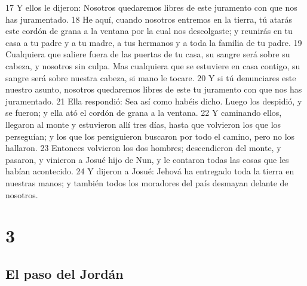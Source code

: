 17 Y ellos le dijeron: Nosotros quedaremos libres de este juramento con que nos has juramentado.
18 He aquí, cuando nosotros entremos en la tierra, tú atarás este cordón de grana a la ventana por la cual nos descolgaste; y reunirás en tu casa a tu padre y a tu madre, a tus hermanos y a toda la familia de tu padre.
19 Cualquiera que saliere fuera de las puertas de tu casa, su sangre será sobre su cabeza, y nosotros sin culpa. Mas cualquiera que se estuviere en casa contigo, su sangre será sobre nuestra cabeza, si mano le tocare.
20 Y si tú denunciares este nuestro asunto, nosotros quedaremos libres de este tu juramento con que nos has juramentado.
21 Ella respondió: Sea así como habéis dicho. Luego los despidió, y se fueron; y ella ató el cordón de grana a la ventana.
22 Y caminando ellos, llegaron al monte y estuvieron allí tres días, hasta que volvieron los que los perseguían; y los que los persiguieron buscaron por todo el camino, pero no los hallaron.
23 Entonces volvieron los dos hombres; descendieron del monte, y pasaron, y vinieron a Josué hijo de Nun, y le contaron todas las cosas que les habían acontecido.
24 Y dijeron a Josué: Jehová ha entregado toda la tierra en nuestras manos; y también todos los moradores del país desmayan delante de nosotros.

\chapter{3}

\section*{El paso del Jordán}

